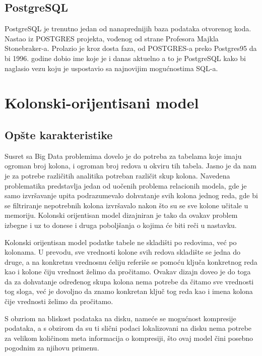 \documentclass[12pt,oneside]{memoir}
\begin{document}
\subsection{PostgreSQL}

PostgreSQL je trenutno jedan od nanaprednijih baza podataka otvorenog koda.  Nastao iz POSTGRES projekta, vođenog od strane
Profesora Majkla Stonebraker-a. Prolazio je kroz dosta faza, od POSTGRES-a preko Postgres95 da bi 1996. godine dobio ime koje je i danas aktuelno a to je PostgreSQL kako bi naglasio vezu koju je uspostavio sa najnovijim mogućnostima SQL-a. \cite{PostgresHistory}
\section{Kolonski-orijentisani model}
\subsection{Opšte karakteristike}
\cite{ColumnarOriented}
Susret sa Big Data problemima dovelo je do potreba za tabelama koje imaju ogroman broj kolona, i ogroman broj redova u okviru tih tabela. Jasno je da nam je za potrebe različitih analitika potreban različit skup kolona. Navedena problematika predstavlja jedan od uočenih problema relacionih modela, gde je samo izvršavanje upita podrazumevalo dohvatanje svih kolona jednog reda, gde bi se filtriranje nepotrebnih kolona izvršavalo nakon što su se sve kolone učitale u memoriju. Kolonski orijentisan model dizajniran je tako da ovakav problem izbegne i uz to donese i druga poboljšanja o kojima će biti reči u nastavku.

Kolonski orijentisan model podatke tabele ne skladišti po redovima, već po kolonama. U prevodu, sve vrednosti kolone svih redova skladište se jedna do druge, a na konkretnu vrednosnu ćeliju referiše se pomoću ključa konkretnog reda kao i kolone čiju vrednost želimo da pročitamo. Ovakav dizajn doveo je do toga da za dohvatanje određenog skupa kolona nema potrebe da čitamo sve vrednosti tog sloga, već je dovoljno da znamo konkretan ključ tog reda kao i imena kolona čije vrednosti želimo da pročitamo.

S obzriom na bliskost   podataka na disku, nameće se mogućnost kompresije podataka, a s obzirom da su ti slični podaci lokalizovani na disku nema potrebe za velikom količinom meta informacija o kompresiji, što ovaj model čini posebno pogodnim za njihovu primenu.
\end{document}
